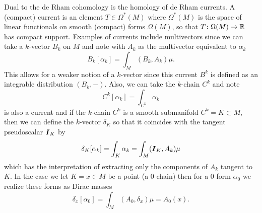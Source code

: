 \documentclass{article}
\begin{document}
Dual to the de Rham cohomology is the homology of de Rham currents. A (compact) current is an element $T\in \Omega^*(M)$ where $\Omega^*(M)$ is the space of linear functionals on smooth (compact) forms $\Omega(M)$, so that $T\colon \Omega(M)\to \mathbb{R}$ has compact support. Examples of currents include multivectors since we can take a $k$-vector $B_{k}$ on $M$ and note with $A_k$ as the multivector equivalent to $\alpha_k$
\begin{equation}
    B_k[\alpha_k] = \int_M (B_k,A_k) \mu.
\end{equation}
This allows for a weaker notion of a $k$-vector since this current $B^k$ is defined as an integrable distribution $(B_k,-)$. Also, we can take the $k$-chain $C^k$ and note
\begin{equation}
    C^k[\alpha_k] = \int_{C^k} \alpha_k
\end{equation}
is also a current and if the $k$-chain $C^k$ is a smooth submanifold $C^k=K\subset M$, then we can define the $k$-vector $\delta_K$ so that it coincides with the tangent pseudoscalar $\boldsymbol{I}_K$ by
\begin{equation}
\delta_K[\alpha_k] = \int_{K} \alpha_k = \int_{M} (\boldsymbol{I}_K, A_k)\mu
\end{equation}
which has the interpretation of extracting only the components of $A_k$ tangent to $K$. In the case we let $K=x\in M$ be a point (a $0$-chain) then for a $0$-form $\alpha_0$ we realize these forms as Dirac masses
\begin{equation}
\delta_x[\alpha_0] = \int_M (A_0,\delta_x) \mu = A_0(x).
\end{equation}
\end{document}
